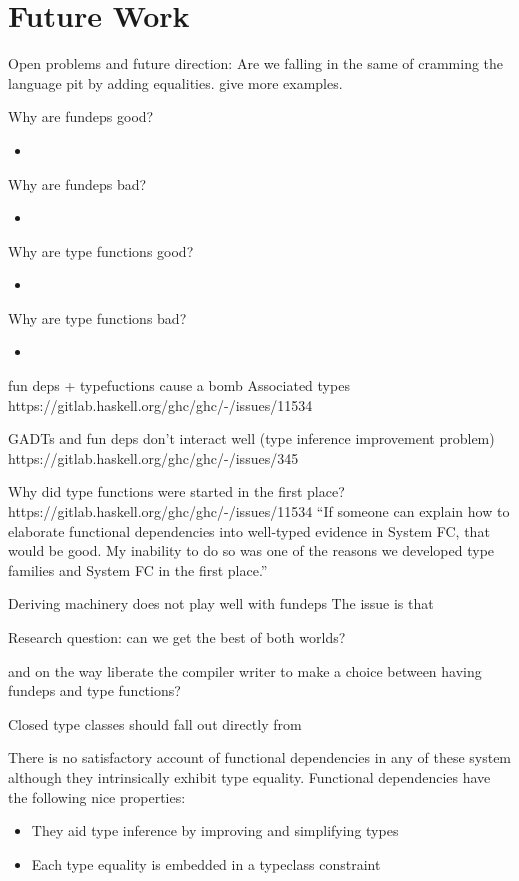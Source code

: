\documentclass[screen,nonacm,manuscript,review]{acmart} %
\begin{document}
\section{Future Work}\label{sec:future-work}
Open problems and future direction: Are we falling in the same of
cramming the language pit by adding equalities. give more examples.

Why are fundeps good?
\begin{itemize}
\item
\end{itemize}

Why are fundeps bad?
\begin{itemize}
\item
\end{itemize}

Why are type functions good?
\begin{itemize}
\item
\end{itemize}

Why are type functions bad?
\begin{itemize}
\item
\end{itemize}

fun deps + typefuctions cause a bomb
Associated types https://gitlab.haskell.org/ghc/ghc/-/issues/11534

GADTs and fun deps don't interact well (type inference improvement problem)
https://gitlab.haskell.org/ghc/ghc/-/issues/345

Why did type functions were started in the first place?
https://gitlab.haskell.org/ghc/ghc/-/issues/11534
``If someone can explain how to elaborate functional dependencies into well-typed evidence in System FC, that would be good. My inability to do so was one of the reasons we developed type families and System FC in the first place.''

Deriving machinery does not play well with fundeps
The issue is that

Research question:
can we get the best of both worlds?

and on the way liberate the compiler writer to make a choice between
having fundeps and type functions?

Closed type classes should fall out directly from


There is no satisfactory account of functional
dependencies in any of these system although they intrinsically exhibit
type equality. Functional dependencies have the following nice
properties\cite{jones_simplifying_1995}:
\begin{itemize}
\item They aid type inference by improving and simplifying types
\item Each type equality is embedded in a typeclass constraint
\end{itemize}
\end{document}
